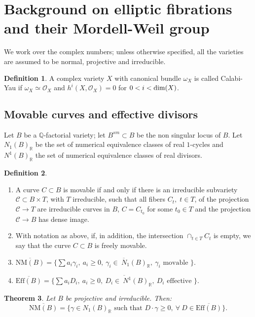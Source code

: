 \documentclass[11pt]{amsart}
\newtheorem{theorem}{Theorem}[section]
\theoremstyle{definition}
\newtheorem{definition}[theorem]{Definition}
\theoremstyle{definition}
\theoremstyle{remark}
\theoremstyle{remark}
\theoremstyle{definition}
\theoremstyle{conjecture}
\begin{document}
\section{Background on elliptic fibrations and their Mordell-Weil group} \label{sec:Background}
 We work over the complex numbers; {unless otherwise specified, all the varieties are assumed to be normal, projective and irreducible}.

\begin{definition} \label{def-CY}
    A complex variety $X$ with canonical bundle $\omega_X$ is called Calabi-Yau if $\omega_X \simeq {\mathcal O}_X$ and $h^{i}(X,{\mathcal{O} }_X) =0$ for $0<i< {\rm dim}(X)$.
\end{definition}


\subsection{Movable curves and effective divisors}
Let $B$ be a $\mathbb Q$-factorial variety; let $B^{sm} \subset B$ be the non singular locus of $B$.
Let $N_1(B)_{\mathbb{R}}$ be the set of  numerical equivalence  classes of  real $1$-cycles and 
  $N^1(B)_{\mathbb{R}}$ the set of  numerical equivalence  classes of  real  divisors.
\begin{definition}\label{movable}
\begin{enumerate}
\item  A curve $C\subset B$ is movable if and only if there is an irreducible subvariety ${\mathcal C}\subset B\times T$, with $T$ irreducible, such that all fibers $C_t,\;t\in T$, of the projection ${\mathcal C}\to T$
are irreducible curves in $B$, $C=C_{t_0}$ for some $t_0\in T$ and  the projection ${\mathcal C}\to B$ has dense image.
\item With notation as above, if, in addition, the intersection
    $\cap_{t\in T}C_t$ is empty, we say that the curve $C\subset B$ is
        freely movable.
   \item $\overline{\mathrm{NM}(B)}=\overline{\{ \sum a_i \gamma_i, \ a_i \geq 0, \ \gamma_i \in \ N_1(B)_{\mathbb{R}}, \ \gamma_i \text{ movable }\}}.$
	\item $\overline{\mathrm{Eff}(B)}=\overline{\{ \sum a_i D_i, \ a_i \geq 0, \ D_i \in \ N^1(B)_{\mathbb{R}}, \ D_i \text{ effective }\}}.$
\end{enumerate}

\end{definition}
\begin{theorem}\label{thm:BDPaP}%
\cite{BDPP}
 Let $B$ be projective  and irreducible. Then: $$\overline{\mathrm{NM}(B)}= \{ \gamma \in N_1(B)_{\mathbb{R}} \text{ such that } D \cdot \gamma \geq 0, \ \forall  \ D \in \overline{\mathrm{Eff}(B)} \}.$$

\end{theorem}
\end{document}
